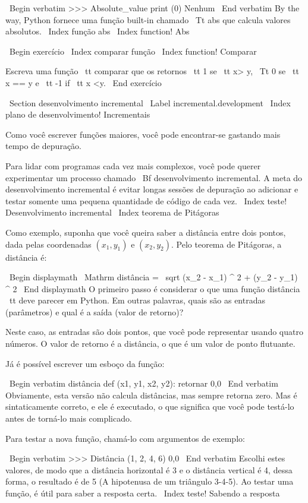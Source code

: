 \documentclass[10pt]{book}
\begin{document}
{{{{\ Begin {verbatim}
>>> Absolute_value print (0)
Nenhum
\ End {verbatim}
%
By the way, Python fornece uma função built-in chamado 
{\ Tt abs} que calcula valores absolutos.
\ Index {função abs}
\ Index {function! Abs}

\ Begin {} exercício
\ Index {comparar função}
\ Index {function! Comparar}

Escreva uma função {\ tt comparar}
que os retornos {\ tt 1} se {\ tt x> y},
{\ Tt 0} se {\ tt x == y} e {\ tt -1} if {\ tt x <y}.
\ End {} exercício


\ Section {desenvolvimento incremental}
\ Label {} incremental.development
\ Index {plano de desenvolvimento! Incrementais}

Como você escrever funções maiores, você pode encontrar-se
gastando mais tempo de depuração.

Para lidar com programas cada vez mais complexos,
você pode querer experimentar um processo chamado
{\ Bf desenvolvimento incremental}. A meta do desenvolvimento incremental
é evitar longas sessões de depuração ao adicionar e testar somente
uma pequena quantidade de código de cada vez.
\ Index {teste! Desenvolvimento incremental}
\ Index {teorema de Pitágoras}

Como exemplo, suponha que você queira saber a distância entre dois
pontos, dada pelas coordenadas $ (x_1, y_1) $ e $ (x_2, y_2) $.
Pelo teorema de Pitágoras, a distância é:

\ Begin {displaymath}
\ Mathrm {distância} = \ sqrt {(x_2 - x_1) ^ 2 + (y_2 - y_1) ^ 2}
\ End {displaymath}
%
O primeiro passo é considerar o que uma função distância {\ tt} deve
parecer em Python. Em outras palavras, quais são as entradas (parâmetros)
e qual é a saída (valor de retorno)?

Neste caso, as entradas são dois pontos, que você pode representar
usando quatro números. O valor de retorno é a distância, o que é
um valor de ponto flutuante.

Já é possível escrever um esboço da função:

\ Begin {verbatim}
distância def (x1, y1, x2, y2):
    retornar 0,0
\ End {verbatim}
%
Obviamente, esta versão não calcula distâncias, mas sempre retorna
zero. Mas é sintaticamente correto, e ele é executado, o que significa que
você pode testá-lo antes de torná-lo mais complicado.

Para testar a nova função, chamá-lo com argumentos de exemplo:

\ Begin {verbatim}
>>> Distância (1, 2, 4, 6)
0,0
\ End {verbatim}
%
Escolhi estes valores, de modo que a distância horizontal é 3 e o
distância vertical é 4, dessa forma, o resultado é de 5
(A hipotenusa de um triângulo 3-4-5). Ao testar uma função, é
útil para saber a resposta certa.
\ Index {teste! Sabendo a resposta}

}}}}
\end{document}
